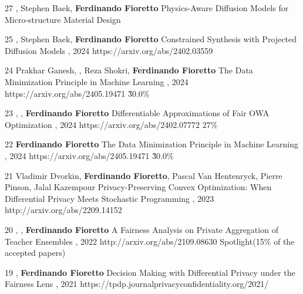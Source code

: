 \begin{pubs}
\wsentry
	{27}
	{, Stephen Baek, {\bf Ferdinando Fioretto}}
	{Physics-Aware Diffusion Models for Micro-structure Material Design}
	{}
	{~}


\wsentry
 	{25}
	{, Stephen Baek, {\bf Ferdinando Fioretto}}
  	{Constrained Synthesis with Projected Diffusion Models}
  	{, 2024}
	{https://arxiv.org/abs/2402.03559}

\wsentryAR
	{24}
	{Prakhar Ganesh, , Reza Shokri, {\bf Ferdinando Fioretto}}
	{The Data Minimization Principle in Machine Learning}
	{, 2024}
	{https://arxiv.org/abs/2405.19471}
	{\~30.0\%}

\wsentryAR
	{23}
	{, , {\bf Ferdinando Fioretto}}
	{Differentiable Approximations of Fair OWA Optimization}
	{, 2024}
	{https://arxiv.org/abs/2402.07772}
	{27\%}

\wsentryAR
	{22}
	{{\bf Ferdinando Fioretto}}
	{The Data Minimization Principle in Machine Learning}
	{, 2024}
	{https://arxiv.org/abs/2405.19471}
	{\~30.0\%}

\wsentry 
	{21}%
	{Vladimir Dvorkin, {\bf Ferdinando Fioretto}, Pascal Van Hentenryck, Pierre Pinson, Jalal Kazempour}
	{Privacy-Preserving Convex Optimization: When Differential Privacy Meets Stochastic Programming}
	{, 2023}
	{http://arxiv.org/abs/2209.14152}

\wsentryAwd
	{20} %
	{, , {\bf Ferdinando Fioretto}}
	{A Fairness Analysis on Private Aggregation of Teacher Ensembles}
	{, 2022}
	{http://arxiv.org/abs/2109.08630}
	{Spotlight}{(15\% of the accepted papers)}
	
\wsentry
	{19} %
	{, {\bf Ferdinando Fioretto}}
	{Decision Making with Differential Privacy under the Fairness Lens}
	{, 2021}
	{https://tpdp.journalprivacyconfidentiality.org/2021/}
 

\end{pubs}

